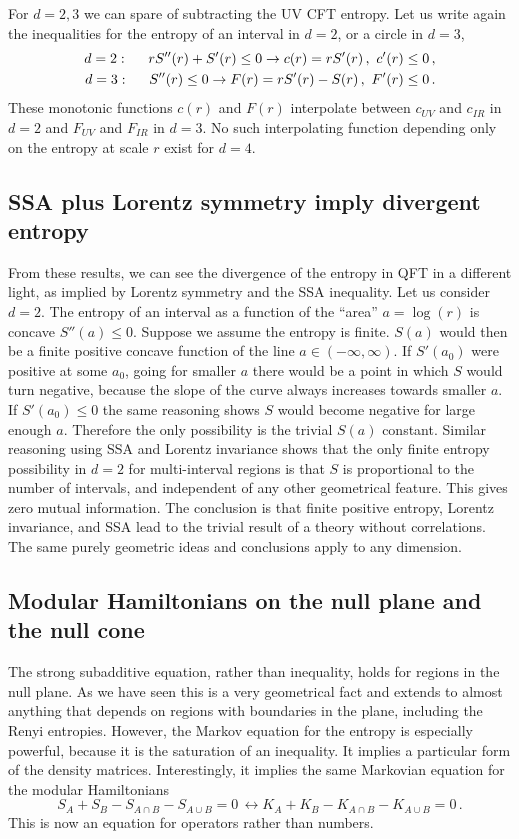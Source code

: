 \documentclass[11pt]{article}
\numberwithin{equation}{section}
\newcommand\eea{\end{eqnarray}}
\newcommand\bea{\begin{eqnarray}}
\newcommand{\be}{\begin{equation}}
\newcommand{\ee}{\end{equation}}
\begin{document}
\bigskip

For $d=2,3$ we can spare of subtracting the UV CFT entropy. 
Let us write again the inequalities for the entropy of an interval in $d=2$, or a circle in $d=3$,
\bea
d=2:\hspace{.5cm}r S''(r)+S'(r)\le 0 \rightarrow c(r)=r S'(r)\,, \,\,c'(r)\le 0\,,\\
d=3:\hspace{.5cm}S''(r)\le 0 \rightarrow F(r)=r S'(r)-S(r)\,,\,\, F'(r)\le 0\,.
\eea
These monotonic functions $c(r)$ and $F(r)$ interpolate between $c_{UV}$ and $c_{IR}$ in $d=2$ and $F_{UV}$ and $F_{IR}$ in $d=3$. No such interpolating function depending only on the entropy at scale $r$ exist for $d=4$. 

 

\subsection{SSA plus Lorentz symmetry imply divergent entropy}

From these results, we can see the divergence of the entropy in QFT in a different light, as implied by Lorentz symmetry and the SSA inequality. 
 Let us consider $d=2$. The entropy of an interval as a function of the ``area'' $a=\log(r)$ is concave $S''(a)\le 0$. 
 Suppose we assume the entropy is finite. $S(a)$ would then be a finite positive concave function of the line $a\in (-\infty,\infty)$.  
 If $S'(a_0)$ were positive at some $a_0$, going for smaller $a$ there would be a point in which $S$ would turn negative, because the slope of the curve always increases towards smaller $a$. If  $S'(a_0)\le 0$ the same reasoning shows $S$ would become negative for large enough $a$. Therefore the only possibility is the trivial $S(a)$ constant. Similar reasoning using SSA and Lorentz invariance shows that the only finite entropy possibility in $d=2$ for multi-interval regions is that $S$ is proportional to the number of intervals, and independent of any other geometrical feature. This gives zero mutual information. The conclusion is that finite positive entropy, Lorentz invariance, and SSA lead to the trivial result of a theory without correlations. The same purely geometric ideas and conclusions apply to any dimension.    


\subsection{Modular Hamiltonians on the null plane and the null cone}
The strong subadditive equation, rather than inequality, holds for regions in the null plane. As we have seen this is a very geometrical fact and extends to almost anything that depends on regions with boundaries in the plane, including the Renyi entropies. However, the Markov equation for the entropy is especially powerful, because it is the saturation of an inequality. It implies a particular form of the density matrices. Interestingly, it implies the same Markovian  equation for the modular Hamiltonians
\be
S_A+S_B-S_{A\cap B}-S_{A\cup B}=0 \,\leftrightarrow K_A+K_B-K_{A\cap B}-K_{A\cup B}=0\,.
\ee
This is now an equation for operators rather than numbers. 
\end{document}

